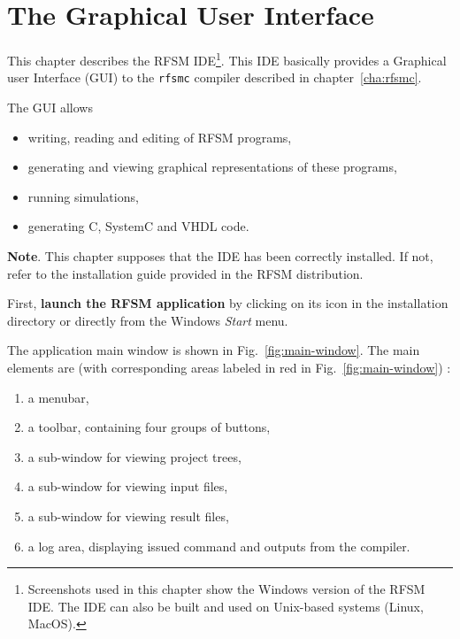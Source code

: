 \chapter{The Graphical User Interface}
\label{cha:gui}

This chapter describes the RFSM IDE\footnote{Screenshots used in this chapter show the Windows
  version of the RFSM IDE. The IDE can also be built and used on Unix-based systems (Linux,
  MacOS).}. This IDE basically provides a Graphical user Interface (GUI) to the \verb|rfsmc|
compiler described in chapter~\ref{cha:rfsmc}.

\medskip
The GUI allows
\begin{itemize}
\item writing, reading and editing of RFSM programs,
\item generating and viewing graphical representations of these programs,
\item running simulations,
\item generating C, SystemC and VHDL code.
\end{itemize}

\medskip
\textbf{Note}. This chapter supposes that the IDE has been correctly installed. If not, refer to the
installation guide provided in the RFSM distribution.

\medskip
First, \textbf{launch the RFSM application} by clicking on its icon in the installation directory or
directly from the Windows \emph{Start} menu. 

\medskip
The application main window is shown in Fig.~\ref{fig:main-window}. 
The main elements are (with corresponding areas labeled in red in Fig.~\ref{fig:main-window}) :
\begin{enumerate}
\item a menubar,
\item a toolbar, containing four groups of buttons,
\item a sub-window for viewing project trees,
\item a sub-window for viewing input files,
\item a sub-window for viewing result files,
\item a log area, displaying issued command and outputs from the compiler.
\end{enumerate}

